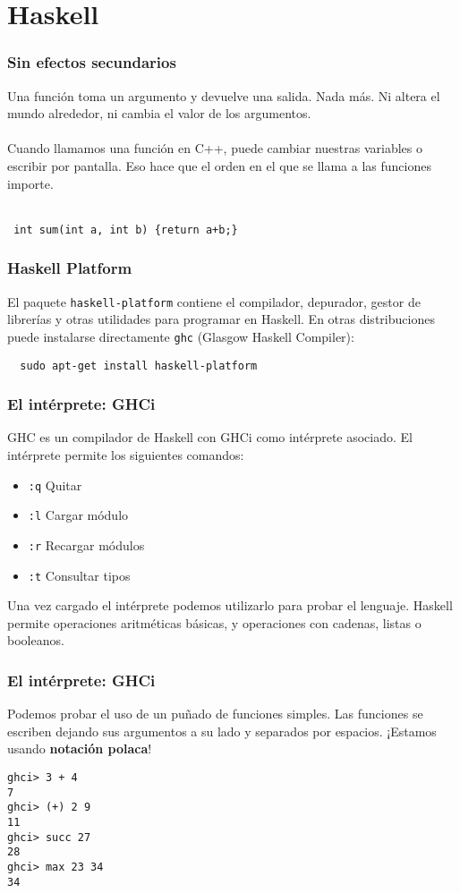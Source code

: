 \section{Haskell}
\begin{frame}[fragile]
  \frametitle{Sin efectos secundarios}
    Una función toma un argumento y devuelve una salida. Nada más. Ni
    altera el mundo alrededor, ni cambia el valor de los argumentos.
    \\~\\
    Cuando llamamos una función en C++, puede cambiar nuestras variables
    o escribir por pantalla. Eso hace que el orden en el que se llama a las
    funciones importe.
    \\~\\
\begin{lstlisting}
 int sum(int a, int b) {return a+b;}
\end{lstlisting}

\end{frame}


\begin{frame}[fragile]
  \frametitle{Haskell Platform}
  El paquete \texttt{haskell-platform} contiene el compilador, depurador, gestor de 
  librerías y otras utilidades para programar en Haskell.
  En otras distribuciones puede instalarse directamente \texttt{ghc} 
  (Glasgow Haskell Compiler):
  \begin{lstlisting}
  sudo apt-get install haskell-platform
  \end{lstlisting}
\end{frame}

\begin{frame}
  \frametitle{El intérprete: GHCi}
  GHC es un compilador de Haskell con GHCi como intérprete asociado. 
  El intérprete permite los siguientes comandos:
  \begin{itemize}
    \item \texttt{:q} \qquad  Quitar
    \item \texttt{:l} \qquad  Cargar módulo
    \item \texttt{:r} \qquad  Recargar módulos
    \item \texttt{:t} \qquad  Consultar tipos
  \end{itemize}
  
  Una vez cargado el intérprete podemos utilizarlo para probar el lenguaje.
  Haskell permite operaciones aritméticas básicas, y operaciones con
  cadenas, listas o booleanos.
\end{frame}

\begin{frame}[fragile]
  \frametitle{El intérprete: GHCi}
  Podemos probar el uso de un puñado de funciones simples. Las funciones
  se escriben dejando sus argumentos a su lado y separados por espacios. ¡Estamos usando
  \textbf{notación polaca}!
  
\begin{lstlisting}
ghci> 3 + 4
7
ghci> (+) 2 9
11
ghci> succ 27
28
ghci> max 23 34
34
\end{lstlisting}
\end{frame}
